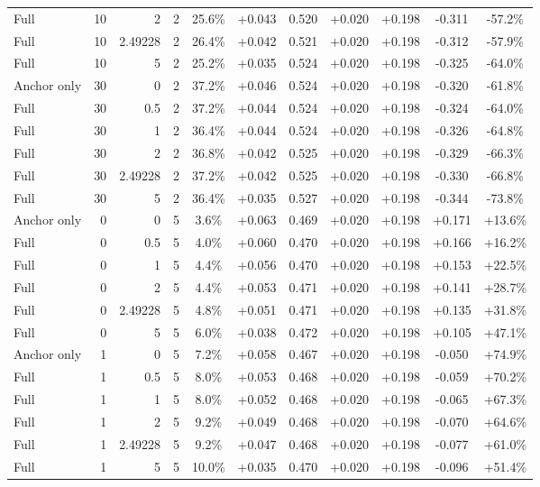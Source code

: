 \begin{table}[htbp]
\begin{tabular}{lrrrccccccc}
Full & 10 & 2 & 2 & 25.6\% & +0.043 & 0.520 & +0.020 & +0.198 & -0.311 & -57.2\% \\
Full & 10 & 2.49228 & 2 & 26.4\% & +0.042 & 0.521 & +0.020 & +0.198 & -0.312 & -57.9\% \\
Full & 10 & 5 & 2 & 25.2\% & +0.035 & 0.524 & +0.020 & +0.198 & -0.325 & -64.0\% \\
Anchor only & 30 & 0 & 2 & 37.2\% & +0.046 & 0.524 & +0.020 & +0.198 & -0.320 & -61.8\% \\
Full & 30 & 0.5 & 2 & 37.2\% & +0.044 & 0.524 & +0.020 & +0.198 & -0.324 & -64.0\% \\
Full & 30 & 1 & 2 & 36.4\% & +0.044 & 0.524 & +0.020 & +0.198 & -0.326 & -64.8\% \\
Full & 30 & 2 & 2 & 36.8\% & +0.042 & 0.525 & +0.020 & +0.198 & -0.329 & -66.3\% \\
Full & 30 & 2.49228 & 2 & 37.2\% & +0.042 & 0.525 & +0.020 & +0.198 & -0.330 & -66.8\% \\
Full & 30 & 5 & 2 & 36.4\% & +0.035 & 0.527 & +0.020 & +0.198 & -0.344 & -73.8\% \\
Anchor only & 0 & 0 & 5 & 3.6\% & +0.063 & 0.469 & +0.020 & +0.198 & +0.171 & +13.6\% \\
Full & 0 & 0.5 & 5 & 4.0\% & +0.060 & 0.470 & +0.020 & +0.198 & +0.166 & +16.2\% \\
Full & 0 & 1 & 5 & 4.4\% & +0.056 & 0.470 & +0.020 & +0.198 & +0.153 & +22.5\% \\
Full & 0 & 2 & 5 & 4.4\% & +0.053 & 0.471 & +0.020 & +0.198 & +0.141 & +28.7\% \\
Full & 0 & 2.49228 & 5 & 4.8\% & +0.051 & 0.471 & +0.020 & +0.198 & +0.135 & +31.8\% \\
Full & 0 & 5 & 5 & 6.0\% & +0.038 & 0.472 & +0.020 & +0.198 & +0.105 & +47.1\% \\
Anchor only & 1 & 0 & 5 & 7.2\% & +0.058 & 0.467 & +0.020 & +0.198 & -0.050 & +74.9\% \\
Full & 1 & 0.5 & 5 & 8.0\% & +0.053 & 0.468 & +0.020 & +0.198 & -0.059 & +70.2\% \\
Full & 1 & 1 & 5 & 8.0\% & +0.052 & 0.468 & +0.020 & +0.198 & -0.065 & +67.3\% \\
Full & 1 & 2 & 5 & 9.2\% & +0.049 & 0.468 & +0.020 & +0.198 & -0.070 & +64.6\% \\
Full & 1 & 2.49228 & 5 & 9.2\% & +0.047 & 0.468 & +0.020 & +0.198 & -0.077 & +61.0\% \\
Full & 1 & 5 & 5 & 10.0\% & +0.035 & 0.470 & +0.020 & +0.198 & -0.096 & +51.4\% \\

\end{tabular}
\end{table}
